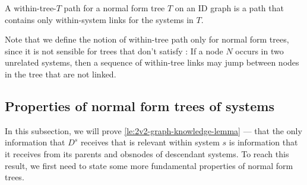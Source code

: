 \begin{definition}
A within-tree-$T$ path for a normal form tree $T$ on an ID graph is a path that contains only within-system links for the systems in $T$.
\end{definition}

Note that we define the notion of within-tree path only for normal form trees, since it is not sensible for trees that don't satisfy \systemsAndPathsUniqueness: If a node $N$ occurs in two unrelated systems, then a sequence of within-tree links may jump between nodes in the tree that are not linked.


\subsection{Properties of normal form trees of systems} 
\label{sec:graph-knowledge-lemma-proof}


In this subsection, we will prove \cref{le:2v2-graph-knowledge-lemma} --- that 
the only information that $D^s$ receives that is relevant within system $s$ is information that it receives from its parents and obsnodes of descendant systems.
To reach this result, we first need to state some more fundamental properties of normal form trees.




